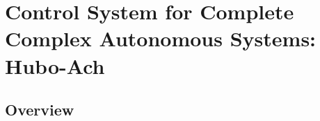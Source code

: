 \chapter{Control System for Complete Complex Autonomous Systems: Hubo-Ach}\label{sec:hubo-ach}

\section{Overview}





